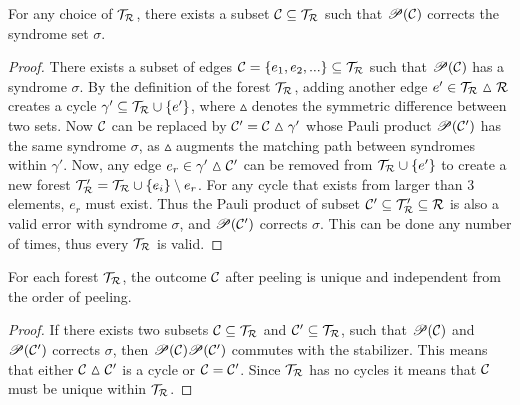 \begin{lemma}\label{lem:anyforest}
  For any choice of $\mathcal{T}_{\mathcal{R}}$, there exists a subset $\mathcal{C}\subseteq \mathcal{T}_{\mathcal{R}}$ such that $\mathscr{P}(\mathcal{C})$ corrects the syndrome set $\sigma$.
\end{lemma}
\begin{proof}
  There exists a subset of edges $\mathcal{C} = \{e_1,e_2,...\} \subseteq \mathcal{T}_{\mathcal{R}}$ such that $\mathscr{P}(\mathcal{C})$ has a syndrome $\sigma$. By the definition of the forest $\mathcal{T}_{\mathcal{R}}$, adding another edge $e' \in \mathcal{T}_{\mathcal{R}} \vartriangle \mathcal{R}$ creates a cycle $\gamma' \subseteq \mathcal{T}_{\mathcal{R}} \cup \{e'\}$, where $\vartriangle$ denotes the symmetric difference between two sets. Now $\mathcal{C}$ can be replaced by $\mathcal{C}'=\mathcal{C}\vartriangle\gamma'$ whose Pauli product $\mathscr{P}(\mathcal{C}')$ has the same syndrome $\sigma$, as $\vartriangle$ augments the matching path between syndromes within $\gamma'$. Now, any edge $e_r\in \gamma' \vartriangle \mathcal{C}'$ can be removed from $\mathcal{T}_{\mathcal{R}} \cup \{e'\}$ to create a new forest $\mathcal{T}_{\mathcal{R}}'=\mathcal{T}_{\mathcal{R}} \cup \{e_i\}\setminus e_r$. For any cycle that exists from larger than 3 elements, $e_r$ must exist. Thus the Pauli product of subset $\mathcal{C}' \subseteq \mathcal{T}_{\mathcal{R}}'\subseteq \mathcal{R}$ is also a valid error with syndrome $\sigma$, and $\mathscr{P}(\mathcal{C}')$ corrects $\sigma$. This can be done any number of times, thus every $\mathcal{T}_{\mathcal{R}}$ is valid.
\end{proof}
\begin{lemma}\label{lem:peelingfe}
  For each forest $\mathcal{T}_{\mathcal{R}}$, the outcome $\mathcal{C}$ after peeling is unique and independent from the order of peeling.
\end{lemma}
\begin{proof}
  If there exists two subsets $\mathcal{C}\subseteq \mathcal{T}_{\mathcal{R}}$ and $\mathcal{C}' \subseteq \mathcal{T}_{\mathcal{R}}$, such that $\mathscr{P}(\mathcal{C})$ and $\mathscr{P}(\mathcal{C}')$ corrects $\sigma$, then $\mathscr{P}(\mathcal{C})\mathscr{P}(\mathcal{C}')$ commutes with the stabilizer. This means that either $\mathcal{C}\vartriangle\mathcal{C}'$ is a cycle or $\mathcal{C}=\mathcal{C}'$. Since $\mathcal{T}_{\mathcal{R}}$ has no cycles it means that $\mathcal{C}$ must be unique within $\mathcal{T}_{\mathcal{R}}$.
\end{proof}


